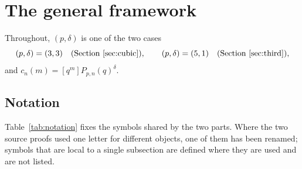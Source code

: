 \section{The general framework}\label{sec:framework}

Throughout, $(p,\delta)$ is one of the two cases
\[
(p,\delta)=(3,3)\quad\text{(Section~\ref{sec:cubic})},\qquad (p,\delta)=(5,1)\quad\text{(Section~\ref{sec:third})},
\]
and $c_n(m)=[q^m]P_{p,n}(q)^\delta$.

\subsection{Notation}\label{sec:notation}
Table~\ref{tab:notation} fixes the symbols shared by the two parts. Where the two source proofs used one letter for
different objects, one of them has been renamed; symbols that are local to a single subsection are defined where they are
used and are not listed.

